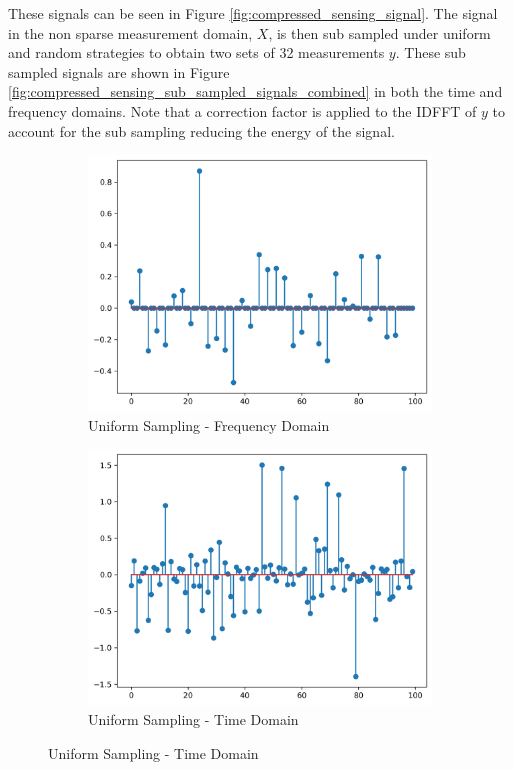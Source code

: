 \documentclass[11pt]{article}
\begin{document}
These signals can be seen in Figure \ref{fig:compressed_sensing_signal}. The signal in the non sparse measurement domain, \(X\), is then sub sampled under uniform and random strategies to obtain two sets of 32 measurements \( y \). These sub sampled signals are shown in Figure \ref{fig:compressed_sensing_sub_sampled_signals_combined} in both the time and frequency domains. Note that a correction factor is applied to the IDFFT of \(y\) to account for the sub sampling reducing the energy of the signal.

\begin{figure}[H]
    \centering
    \begin{subfigure}{.45\textwidth}
        \centering
        \includegraphics[width=\linewidth]{figs/q2b_uniformly_subsampled_signal_fft.png}
        \caption{Uniform Sampling - Frequency Domain}
        \label{fig:uniform_subsampled_signal_fft}
    \end{subfigure}%
    \begin{subfigure}{.45\textwidth}
        \centering
        \includegraphics[width=\linewidth]{figs/q2b_uniformly_subsampled_signal.png}
        \caption{Uniform Sampling - Time Domain}
        \label{fig:uniform_subsampled_signal}
    \end{subfigure}
    

\end{figure}
\end{document}
